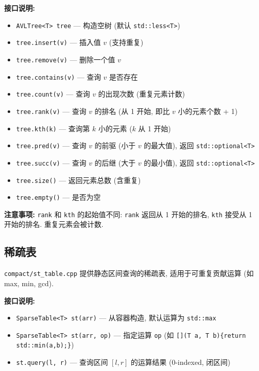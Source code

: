 \documentclass[a4paper]{ctexbook}
\begin{document}
\textbf{接口说明:}
\begin{itemize}
	\item \texttt{AVLTree<T> tree} — 构造空树 (默认 \texttt{std::less<T>})
	\item \texttt{tree.insert(v)} — 插入值 $v$ (支持重复)
	\item \texttt{tree.remove(v)} — 删除一个值 $v$
	\item \texttt{tree.contains(v)} — 查询 $v$ 是否存在
	\item \texttt{tree.count(v)} — 查询 $v$ 的出现次数 (重复元素计数)
	\item \texttt{tree.rank(v)} — 查询 $v$ 的排名 (从 1 开始, 即比 $v$ 小的元素个数 + 1)
	\item \texttt{tree.kth(k)} — 查询第 $k$ 小的元素 ($k$ 从 1 开始)
	\item \texttt{tree.pred(v)} — 查询 $v$ 的前驱 (小于 $v$ 的最大值), 返回 \texttt{std::optional<T>}
	\item \texttt{tree.succ(v)} — 查询 $v$ 的后继 (大于 $v$ 的最小值), 返回 \texttt{std::optional<T>}
	\item \texttt{tree.size()} — 返回元素总数 (含重复)
	\item \texttt{tree.empty()} — 是否为空
\end{itemize}

\textbf{注意事项:} \texttt{rank} 和 \texttt{kth} 的起始值不同: \texttt{rank} 返回从 1 开始的排名, \texttt{kth} 接受从 1 开始的排名. 重复元素会被计数.



\subsection{稀疏表}

\texttt{compact/st\_table.cpp} 提供静态区间查询的稀疏表, 适用于可重复贡献运算 (如 max, min, gcd).

\textbf{接口说明:}
\begin{itemize}
	\item \texttt{SparseTable<T> st(arr)} — 从容器构造, 默认运算为 \texttt{std::max}
	\item \texttt{SparseTable<T> st(arr, op)} — 指定运算 \texttt{op} (如 \texttt{[](T a, T b)\{return std::min(a,b);\}})
	\item \texttt{st.query(l, r)} — 查询区间 $[l, r]$ 的运算结果 (0-indexed, 闭区间)
\end{itemize}
\end{document}
